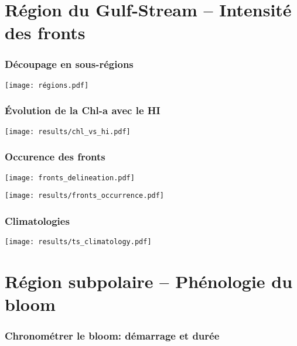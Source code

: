 \documentclass[11pt, french, aspectratio=32]{beamer}
\begin{document}

\section{Région du Gulf-Stream -- Intensité des fronts}


\begin{frame}
  \frametitle{Découpage en sous-régions}
  \texttt{[image: régions.pdf]}
\end{frame}


\begin{frame}
  \frametitle{Évolution de la Chl-a avec le HI}
  \texttt{[image: results/chl\_vs\_hi.pdf]}
\end{frame}


\begin{frame}
  \frametitle{Occurence des fronts}
  \texttt{[image: fronts\_delineation.pdf]}
  \\
  \vfill

  \texttt{[image: results/fronts\_occurrence.pdf]}

\end{frame}


\begin{frame}
  \frametitle{Climatologies}
  \texttt{[image: results/ts\_climatology.pdf]}
\end{frame}


\section{Région subpolaire -- Phénologie du bloom}


\begin{frame}
  \frametitle{Chronométrer le bloom: démarrage et durée}
\end{frame}
\end{document}
